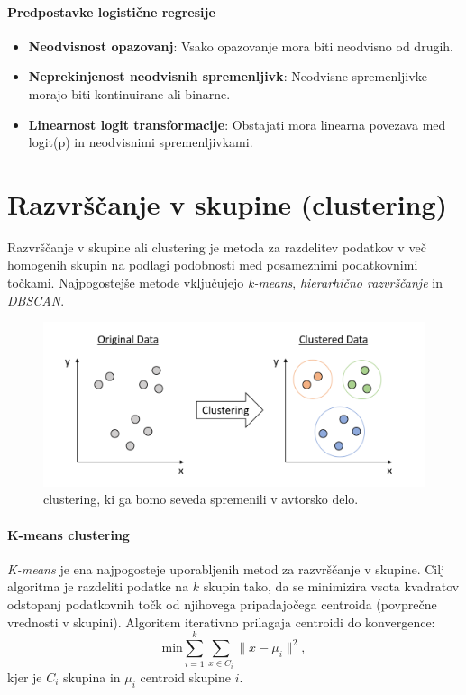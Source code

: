 \paragraph{Predpostavke logistične regresije}
\begin{itemize}
    \item \textbf{Neodvisnost opazovanj}: Vsako opazovanje mora biti neodvisno od drugih.
    \item \textbf{Neprekinjenost neodvisnih spremenljivk}: Neodvisne spremenljivke morajo biti kontinuirane ali binarne.
    \item \textbf{Linearnost logit transformacije}: Obstajati mora linearna povezava med logit(p) in neodvisnimi spremenljivkami.
\end{itemize}

\section{Razvrščanje v skupine (clustering)}

Razvrščanje v skupine ali clustering je metoda za razdelitev podatkov v več homogenih skupin na podlagi podobnosti med posameznimi podatkovnimi točkami. Najpogostejše metode vključujejo \textit{k-means}, \textit{hierarhično razvrščanje} in \textit{DBSCAN}.

\begin{figure}[h]
    \centering
    \includegraphics[width=\textwidth]{pictures/clustering.png}
    \caption{clustering, ki ga bomo seveda spremenili v avtorsko delo.}
    \label{fig:clustering}
\end{figure}


\paragraph{K-means clustering}
\textit{K-means} je ena najpogosteje uporabljenih metod za razvrščanje v skupine. Cilj algoritma je razdeliti podatke na $k$ skupin tako, da se minimizira vsota kvadratov odstopanj podatkovnih točk od njihovega pripadajočega centroida (povprečne vrednosti v skupini). Algoritem iterativno prilagaja centroidi do konvergence:
\[\text{min} \sum_{i=1}^{k} \sum_{x \in C_i} \| x - \mu_i \|^2,\]
kjer je $C_i$ skupina in $\mu_i$ centroid skupine $i$.

